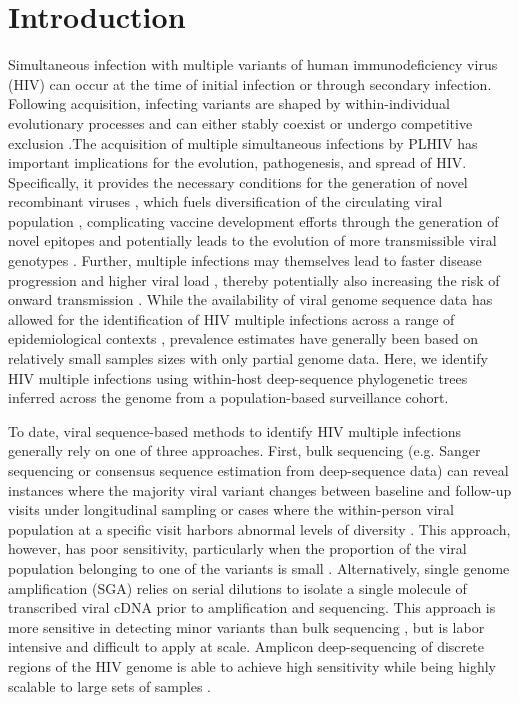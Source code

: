 \documentclass[10pt,letterpaper]{article}
\begin{document}
\section{Introduction}
Simultaneous infection with multiple variants of human immunodeficiency virus (HIV) can occur at the time of initial infection \cite{kijak2017} or through secondary infection\cite{redd2013}. Following acquisition, infecting variants are shaped by within-individual evolutionary processes and can either stably coexist or undergo competitive exclusion \cite{redd2012, wertheim2018}.The acquisition of multiple simultaneous infections by PLHIV has important implications for the evolution, pathogenesis, and spread of HIV. Specifically, it provides the necessary conditions for the generation of novel recombinant viruses \cite{shriner2004, song2018, streeck2008}, which fuels diversification of the circulating viral population \cite{ramirez2008, kim2024}, complicating vaccine development efforts through the generation of novel epitopes \cite{ritchie2014, corey2010} and potentially leads to the evolution of more transmissible viral genotypes \cite{kiwanuka2009}. Further, multiple infections may themselves lead to faster disease progression \cite{gottlieb2004, smith2004, ronen2014} and higher viral load \cite{janes2015, ronen2014, smith2004}, thereby potentially also increasing the risk of onward transmission \cite{quinn2000, fraser2007}. While the availability of viral genome sequence data has allowed for the identification of HIV multiple infections across a range of epidemiological contexts \cite{yuan2024}, prevalence estimates have generally been based on relatively small samples sizes with only partial genome data. Here, we identify HIV multiple infections using within-host deep-sequence phylogenetic trees inferred across the genome from a population-based surveillance cohort. \par

To date, viral sequence-based methods to identify HIV multiple infections generally rely on one of three approaches. First, bulk sequencing (e.g. Sanger  sequencing or consensus sequence estimation from deep-sequence data) can reveal instances where the majority viral variant changes between baseline and follow-up visits under longitudinal sampling or cases where the within-person viral population at a specific visit harbors abnormal levels of diversity \cite{smith2004, cornelissen2007, vanderkuyl2009, chaudron2022}. This approach, however, has poor sensitivity, particularly when the proportion of the viral population belonging to one of the variants is small \cite{rachinger2010}. Alternatively, single genome amplification (SGA) relies on serial dilutions to isolate a single molecule of transcribed viral cDNA prior to amplification and sequencing. This approach is more sensitive in detecting minor variants than bulk sequencing \cite{pacold2010, keele2008, abrahams2009, li2010, dwyer-lindgren2019}, but is labor intensive and difficult to apply at scale. Amplicon deep-sequencing of discrete regions of the HIV genome is able to achieve high sensitivity while being highly scalable to large sets of samples \cite{pacold2010, redd2011, redd2012, redd2014, ronen2013}. \par
\end{document}
